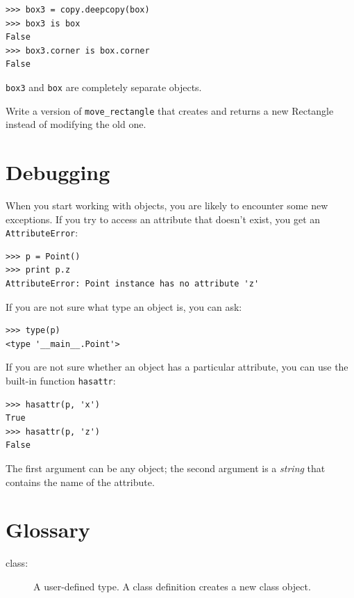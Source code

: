 \documentclass[10pt]{book}
\begin{document}
\begin{CJK}{UTF8}{gbsn}
\begin{verbatim}
>>> box3 = copy.deepcopy(box)
>>> box3 is box
False
>>> box3.corner is box.corner
False
\end{verbatim}
%
{\tt box3} and {\tt box} are completely separate objects.


\begin{exercise}

Write a version of \verb"move_rectangle" that creates and
returns a new Rectangle instead of modifying the old one.

\end{exercise}


\section{Debugging}
\label{hasattr}

When you start working with objects, you are likely to encounter
some new exceptions.  If you try to access an attribute
that doesn't exist, you get an {\tt AttributeError}:

\begin{verbatim}
>>> p = Point()
>>> print p.z
AttributeError: Point instance has no attribute 'z'
\end{verbatim}
%
If you are not sure what type an object is, you can ask:

\begin{verbatim}
>>> type(p)
<type '__main__.Point'>
\end{verbatim}
%
If you are not sure whether an object has a particular attribute,
you can use the built-in function {\tt hasattr}:

\begin{verbatim}
>>> hasattr(p, 'x')
True
>>> hasattr(p, 'z')
False
\end{verbatim}
%
The first argument can be any object; the second argument is a {\em
string} that contains the name of the attribute.


\section{Glossary}

\begin{description}

\item[class:] A user-defined type.  A class definition creates a new
class object.


\end{description}
\end{CJK}
\end{document}
